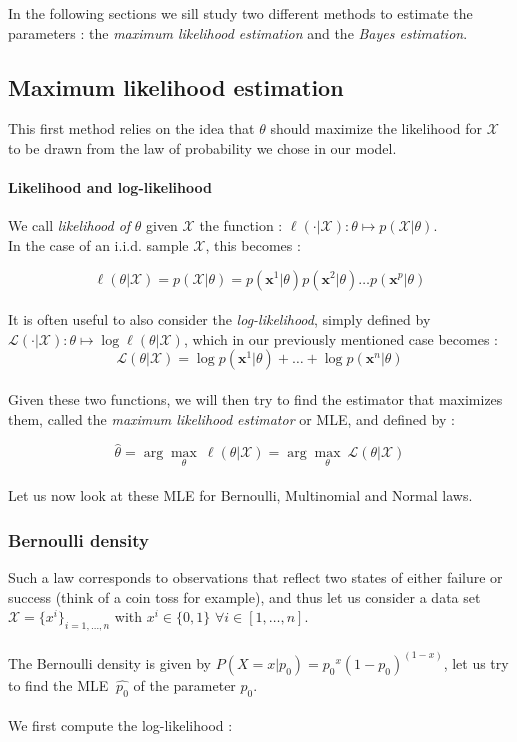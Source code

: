 \documentclass[a4paper,12pt]{article}
\newcommand{\xx}{{\bm x}}
\begin{document}
In the following sections we sill study two different methods to estimate the parameters : the {\em maximum likelihood estimation} and the {\em Bayes estimation}.


\subsection{Maximum likelihood estimation}

This first method relies on the idea that $\theta$ should maximize the likelihood for $\mathcal{X}$ to be drawn from the law of probability we chose in our model.

\paragraph{Likelihood and log-likelihood} We call {\em likelihood of} $\theta$ given $\mathcal{X}$ the function : $\ell(\cdot{}|\mathcal{X}) : \theta \mapsto p(\mathcal{X}|\theta).$\\
In the case of an i.i.d. sample $\mathcal{X}$, this becomes :

\[\ell(\theta|\mathcal{X})=p(\mathcal{X}|\theta)=p(\xx^1|\theta)p(\xx^2|\theta)\dots{}p(\xx^p|\theta)\] \\
It is often useful to also consider the {\em log-likelihood}, simply defined by $\mathcal{L} (\cdot{}|\mathcal{X}) : \theta \mapsto \log \ell(\theta|\mathcal{X})$, which in our previously mentioned case becomes :
\[\mathcal{L}(\theta|\mathcal{X})=\log{p(\xx^1|\theta)}+\dots{}+\log{p(\xx^n|\theta)}\]
\\
Given these two functions, we will then try to find the estimator that maximizes them, called the {\em maximum likelihood estimator} or MLE, and defined by :

\[\hat{\theta}=\arg\underset{\theta}\max \  \ell(\theta|\mathcal{X})=\arg\underset{\theta}\max \  \mathcal{L}(\theta|\mathcal{X})\]\\


Let us now look at these MLE for Bernoulli, Multinomial and Normal laws.

\subsubsection{Bernoulli density}

Such a law corresponds to observations that reflect two states of either failure or success (think of a coin toss for example), and thus let us consider a data set $\mathcal{X}=\{x^i\}_{i=1,\dots,n}$ with  $x^i\in\{0,1\}$ $\forall i\in[1,\dots,n]$.\\
\\
The Bernoulli density is given by $P(X=x|p_0)={p_0}^{x}(1-p_0)^{(1-x)}$, let us try to find the MLE $\ \hat{p_0}$ of the parameter $p_0$.\\
\\
We first compute the log-likelihood :
\end{document}
